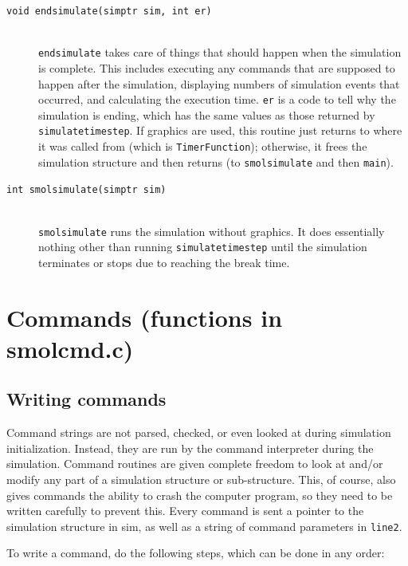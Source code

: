\documentclass {scrbook}
\newcommand {\ttt} {\texttt}
\begin{document}
\begin{description}
\item[\ttt{void endsimulate(simptr sim, int er)}]
\hfill \\
\ttt{endsimulate} takes care of things that should happen when the simulation is complete. This includes executing any commands that are supposed to happen after the simulation, displaying numbers of simulation events that occurred, and calculating the execution time. \ttt{er} is a code to tell why the simulation is ending, which has the same values as those returned by \ttt{simulatetimestep}. If graphics are used, this routine just returns to where it was called from (which is \ttt{TimerFunction}); otherwise, it frees the simulation structure and then returns (to \ttt{smolsimulate} and then \ttt{main}).

\item[\ttt{int smolsimulate(simptr sim)}]
\hfill \\
\ttt{smolsimulate} runs the simulation without graphics. It does essentially nothing other than running \ttt{simulatetimestep} until the simulation terminates or stops due to reaching the break time.

\end{description}

\section{Commands (functions in smolcmd.c)}

\subsection{Writing commands}

Command strings are not parsed, checked, or even looked at during simulation initialization. Instead, they are run by the command interpreter during the simulation. Command routines are given complete freedom to look at and/or modify any part of a simulation structure or sub-structure. This, of course, also gives commands the ability to crash the computer program, so they need to be written carefully to prevent this. Every command is sent a pointer to the simulation structure in sim, as well as a string of command parameters in \ttt{line2}.

To write a command, do the following steps, which can be done in any order:
\end{document}
